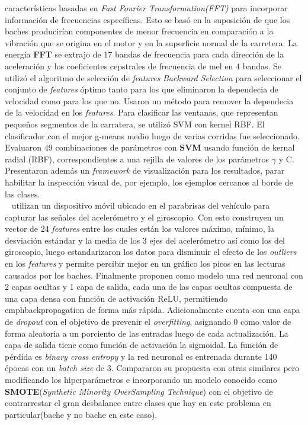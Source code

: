 		características basadas en \emph{Fast Fourier Transformation(FFT)} para incorporar información de frecuencias específicas. Esto se basó en
		la suposición de que los baches producirían componentes de menor frecuencia en comparación a la vibración que se origina en el motor y en
		la superficie normal de la carretera. La energía \textbf{FFT} se extrajo de 17 bandas de frecuencia para cada dirección de la aceleración
		y los coeficientes cepstrales de frecuencia de mel en 4 bandas. Se utilizó el algoritmo de selección de \emph{features} \emph{Backward
		Selection} para seleccionar el conjunto de \emph{features} óptimo tanto para los que eliminaron la dependecia de velocidad como para los
		que no. Usaron un método para remover la dependecia de la velocidad en los \emph{features}. Para clasificar las ventanas, que representan
		pequeños segmentos de la carratera, se utilizó SVM con kernel RBF. El clasificador con el mejor g-means medio luego de varias corridas fue
		seleccionado. Evaluaron 49 combinaciones de parámetros con \textbf{SVM} usando función de kernal radial (RBF), correspondientes a una
		rejilla de valores de los parámetros $\gamma$ y C. Presentaron además un \emph{framework} de visualización para los resultados, parar
		habilitar la inspección visual de, por ejemplo, los ejemplos cercanos al borde de las clases.\\

		~ utilizan un dispositivo móvil ubicado en el parabrisas del vehículo para capturar las señales del acelerómetro y el
		giroscopio. Con esto construyen un vector de 24 \emph{features} entre los cuales están los valores máximo, mínimo, la desviación estándar y la media
		de los 3 ejes del acelerómetro así como los del giroscopio, luego estandarizaron los datos para disminuir el efecto de los \emph{outliers} en los
		\emph{features} y permite percibir mejor en un gráfico los picos en las lecturas causados por los baches. Finalmente proponen como modelo una red
		neuronal con 2 capas ocultas y 1 capa de salida, cada una de las capas ocultas compuesta de una capa densa con función de activación ReLU, permitiendo
		\\emph{backpropagation} de forma más rápida. Adicionalmente cuenta con una capa de \emph{dropout} con el objetivo de prevenir el \emph{overfitting},
		asignando 0 como valor de forma aleatoria a un porciento de las entradas luego de cada actualización. La capa de salida tiene como función de activación
		la sigmoidal. La función de pérdida es \emph{binary cross entropy} y la red neuronal es entrenada durante 140 épocas con un \emph{batch size} de 3.
		Compararon su propuesta con otras similares pero modificando los hiperparámetros e incorporando un modelo conocido como \textbf{SMOTE}(\emph{Synthetic
		Minority OverSampling Technique}) con el objetivo de contrarrestar el gran desbalance entre clases que hay en este problema en particular(bache y no
		bache en este caso).\\

